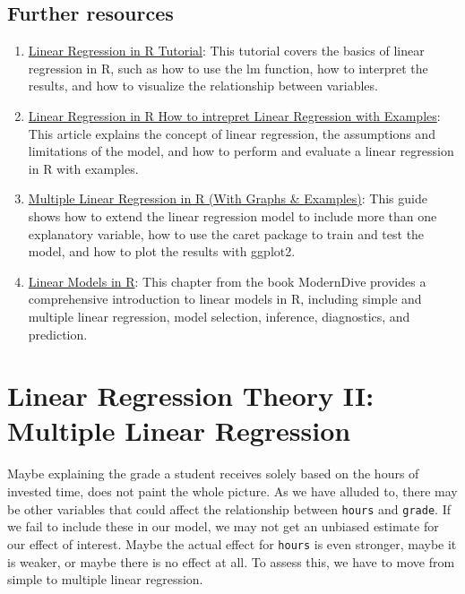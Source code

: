 \documentclass[
]{book}
\providecommand{\tightlist}{%
  \setlength{\itemsep}{0pt}\setlength{\parskip}{0pt}}
\begin{document}
\hypertarget{further-resources-1}{%
\section{Further resources}\label{further-resources-1}}

\begin{enumerate}
\def\labelenumi{\arabic{enumi}.}
\tightlist
\item
  \href{https://www.datacamp.com/tutorial/linear-regression-R}{Linear Regression in R Tutorial}: This tutorial covers the basics of linear regression in R, such as how to use the lm function, how to interpret the results, and how to visualize the relationship between variables.
\item
  \href{https://www.educba.com/linear-regression-in-r/}{Linear Regression in R \textbar{} How to intrepret Linear Regression with Examples}: This article explains the concept of linear regression, the assumptions and limitations of the model, and how to perform and evaluate a linear regression in R with examples.
\item
  \href{https://www.upgrad.com/blog/multiple-linear-regression-in-r/}{Multiple Linear Regression in R (With Graphs \& Examples)}: This guide shows how to extend the linear regression model to include more than one explanatory variable, how to use the caret package to train and test the model, and how to plot the results with ggplot2.
\item
  \href{https://moderndive.com/5-regression.html\#model1table}{Linear Models in R}: This chapter from the book ModernDive provides a comprehensive introduction to linear models in R, including simple and multiple linear regression, model selection, inference, diagnostics, and prediction.
\end{enumerate}

\hypertarget{lin-t-2}{%
\chapter{Linear Regression Theory II: Multiple Linear Regression}\label{lin-t-2}}

Maybe explaining the grade a student receives solely based on the hours of
invested time, does not paint the whole picture. As we have alluded to, there
may be other variables that could affect the relationship between \texttt{hours} and
\texttt{grade}.
If we fail to include these in our model, we may not get an unbiased estimate
for our effect of interest. Maybe the actual effect for \texttt{hours} is even stronger,
maybe it is weaker, or maybe there is no effect at all.
To assess this, we have to move from simple to multiple linear regression.
\end{document}
